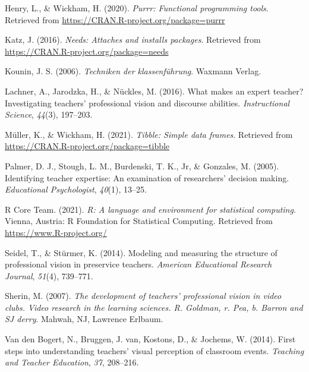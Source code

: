 \documentclass[
  man,floatsintext]{apa6}
\newlength{\cslhangindent}
\newlength{\cslentryspacingunit} %
\newenvironment{CSLReferences}[2] %
 {%
  \setlength{\parindent}{0pt}
  \ifodd #1
  \let\oldpar\par
  \def\par{\hangindent=\cslhangindent\oldpar}
  \fi
  \setlength{\parskip}{#2\cslentryspacingunit}
 }%
 {}
\begin{document}
\begin{CSLReferences}{1}{0}
\leavevmode{}%
Henry, L., \& Wickham, H. (2020). \emph{Purrr: Functional programming tools}. Retrieved from \url{https://CRAN.R-project.org/package=purrr}

\leavevmode{}%
Katz, J. (2016). \emph{Needs: Attaches and installs packages}. Retrieved from \url{https://CRAN.R-project.org/package=needs}

\leavevmode{}%
Kounin, J. S. (2006). \emph{Techniken der klassenf{ü}hrung}. Waxmann Verlag.

\leavevmode{}%
Lachner, A., Jarodzka, H., \& Nückles, M. (2016). What makes an expert teacher? Investigating teachers' professional vision and discourse abilities. \emph{Instructional Science}, \emph{44}(3), 197--203.

\leavevmode{}%
Müller, K., \& Wickham, H. (2021). \emph{Tibble: Simple data frames}. Retrieved from \url{https://CRAN.R-project.org/package=tibble}

\leavevmode{}%
Palmer, D. J., Stough, L. M., Burdenski, T. K., Jr, \& Gonzales, M. (2005). Identifying teacher expertise: An examination of researchers' decision making. \emph{Educational Psychologist}, \emph{40}(1), 13--25.

\leavevmode{}%
R Core Team. (2021). \emph{R: A language and environment for statistical computing}. Vienna, Austria: R Foundation for Statistical Computing. Retrieved from \url{https://www.R-project.org/}

\leavevmode{}%
Seidel, T., \& Stürmer, K. (2014). Modeling and measuring the structure of professional vision in preservice teachers. \emph{American Educational Research Journal}, \emph{51}(4), 739--771.

\leavevmode{}%
Sherin, M. (2007). \emph{The development of teachers' professional vision in video clubs. Video research in the learning sciences. R. Goldman, r. Pea, b. Barron and SJ derry}. Mahwah, NJ, Lawrence Erlbaum.

\leavevmode{}%
Van den Bogert, N., Bruggen, J. van, Kostons, D., \& Jochems, W. (2014). First steps into understanding teachers' visual perception of classroom events. \emph{Teaching and Teacher Education}, \emph{37}, 208--216.


\end{CSLReferences}
\end{document}
